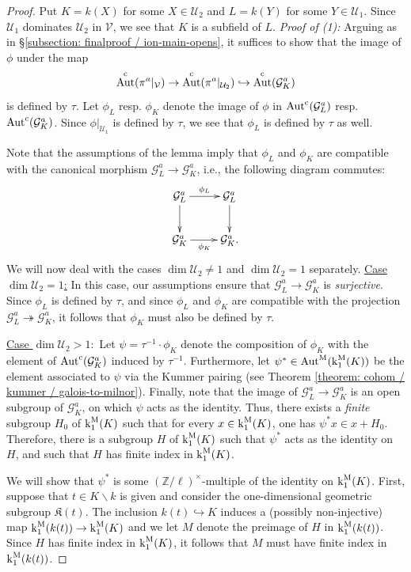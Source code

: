 \documentclass[11pt]{amsart}
\theoremstyle{definition}
\theoremstyle{remark}
\numberwithin{equation}{section}
\DeclareMathOperator{\Aut}{Aut}
\newcommand{\Z}{\mathbb{Z}}
\newcommand{\Vc}{\mathcal{V}}
\newcommand{\Gc}{\mathcal{G}}
\newcommand{\Ucal}{\mathcal{U}}
\newcommand{\Kfrak}{\mathfrak{K}}
\newcommand{\Autm}{\Aut^{\rm M}}
\newcommand{\Autc}{\Aut^{\rm c}}
\renewcommand{\k}{\operatorname{k}^{\rm M}}
\begin{document}
\begin{proof}
  Put $K = k(X)$ for some $X \in \Ucal_2$ and $L = k(Y)$ for some $Y \in \Ucal_1$.
  Since $\Ucal_1$ dominates $\Ucal_2$ in $\Vc$, we see that $K$ is a subfield of $L$.
  \vskip 5pt
  \noindent\emph{Proof of (1):}
  Arguing as in \S\ref{subsection: finalproof / ion-main-opens}, it suffices to show that the image of $\phi$ under the map
  \[ \Autc(\pi^a|_\Vc) \rightarrow \Autc(\pi^a|_{\Ucal_2}) \hookrightarrow \Autc(\Gc_K^a) \]
  is defined by $\tau$.
  Let $\phi_L$ resp. $\phi_K$ denote the image of $\phi$ in $\Autc(\Gc_L^a)$ resp. $\Autc(\Gc_K^a)$.
  Since $\phi|_{\Ucal_1}$ is defined by $\tau$, we see that $\phi_L$ is defined by $\tau$ as well.
  
  Note that the assumptions of the lemma imply that $\phi_L$ and $\phi_K$ are compatible with the canonical morphism $\Gc_L^a \rightarrow \Gc_K^a$, i.e., the following diagram commutes:
  \[ 
  \xymatrix{
    \Gc_L^a \ar[d] \ar[r]^{\phi_L} & \Gc_L^a \ar[d] \\
    \Gc_K^a \ar[r]_{\phi_K} & \Gc_K^a.
  }
  \]
  We will now deal with the cases $\dim \Ucal_2 \neq 1$ and $\dim \Ucal_2 = 1$ separately.
  \vskip 5pt
  \noindent\underline{Case $\dim \Ucal_2 = 1$:} In this case, our assumptions ensure that $\Gc_L^a \rightarrow \Gc_K^a$ is \emph{surjective}.
  Since $\phi_L$ is defined by $\tau$, and since $\phi_L$ and $\phi_K$ are compatible with the projection $\Gc_L^a \twoheadrightarrow \Gc_K^a$, it follows that $\phi_K$ must also be defined by $\tau$.

  \vskip 5pt
  \noindent\underline{Case $\dim \Ucal_2 > 1:$} Let $\psi = \tau^{-1} \cdot \phi_K$ denote the composition of $\phi_K$ with the element of $\Autc(\Gc_K^a)$ induced by $\tau^{-1}$.
  Furthermore, let $\psi^* \in \Autm(\k_1(K))$ be the element associated to $\psi$ via the Kummer pairing (see Theorem \ref{theorem: cohom / kummer / galois-to-milnor}).
  Finally, note that the image of $\Gc_L^a \rightarrow \Gc_K^a$ is an open subgroup of $\Gc_K^a$, on which $\psi$ acts as the identity.
  Thus, there exists a \emph{finite} subgroup $H_0$ of $\k_1(K)$ such that for every $x \in \k_1(K)$, one has $\psi^* x \in x + H_0$.
  Therefore, there is a subgroup $H$ of $\k_1(K)$ such that $\psi^*$ acts as the identity on $H$, and such that $H$ has finite index in $\k_1(K)$.

  We will show that $\psi^*$ is some $(\Z/\ell)^\times$-multiple of the identity on $\k_1(K)$.
  First, suppose that $t \in K \smallsetminus k$ is given and consider the one-dimensional geometric subgroup $\Kfrak(t)$.
  The inclusion $k(t) \hookrightarrow K$ induces a (possibly non-injective) map $\k_1(k(t)) \rightarrow \k_1(K)$ and we let $M$ denote the preimage of $H$ in $\k_1(k(t))$.
  Since $H$ has finite index in $\k_1(K)$, it follows that $M$ must have finite index in $\k_1(k(t))$.


\end{proof}
\end{document}
